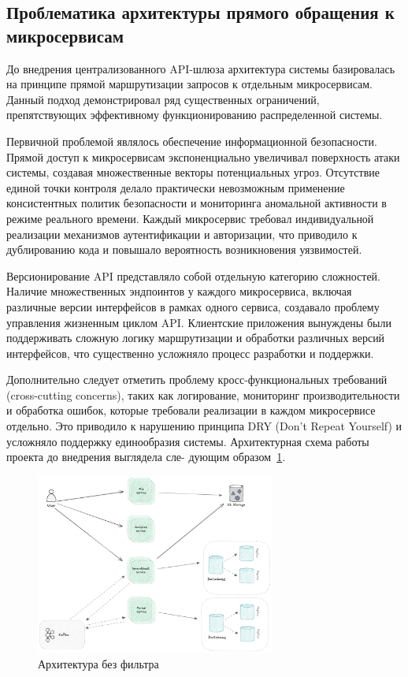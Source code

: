 \subsection{Проблематика архитектуры прямого обращения к микросервисам}

До внедрения централизованного API-шлюза архитектура системы базировалась на принципе прямой маршрутизации запросов к отдельным микросервисам. Данный подход демонстрировал ряд существенных ограничений, препятствующих эффективному функционированию распределенной системы.

Первичной проблемой являлось обеспечение информационной безопасности. Прямой доступ к микросервисам экспоненциально увеличивал поверхность атаки системы, создавая множественные векторы потенциальных угроз. Отсутствие единой точки контроля делало практически невозможным применение консистентных политик безопасности и мониторинга аномальной активности в режиме реального времени. Каждый микросервис требовал индивидуальной реализации механизмов аутентификации и авторизации, что приводило к дублированию кода и повышало вероятность возникновения уязвимостей.

Версионирование API представляло собой отдельную категорию сложностей. Наличие множественных эндпоинтов у каждого микросервиса, включая различные версии интерфейсов в рамках одного сервиса, создавало проблему управления жизненным циклом API. Клиентские приложения вынуждены были поддерживать сложную логику маршрутизации и обработки различных версий интерфейсов, что существенно усложняло процесс разработки и поддержки.

Дополнительно следует отметить проблему кросс-функциональных требований (cross-cutting concerns), таких как логирование, мониторинг производительности и обработка ошибок, которые требовали реализации в каждом микросервисе отдельно. Это приводило к нарушению принципа DRY (Don't Repeat Yourself) и усложняло поддержку единообразия системы.
Архитектурная схема работы проекта до внедрения выглядела сле-
дующим образом~\ref{fig:wo-gateway-project}.

\begin{figure}[htbp]
    \centering
    \includegraphics[width=0.7\textwidth]{Dissertation/images/wo-gateway-project}
    \caption{Архитектура без фильтра}
    \label{fig:wo-gateway-project}
\end{figure}

